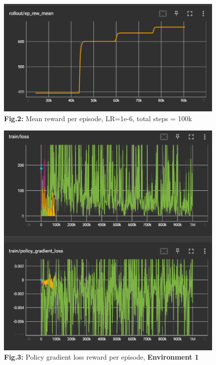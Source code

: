 \documentclass{article}
\numberwithin{equation}{section}
\numberwithin{equation}{section}
\begin{document}
\begin{figure}[H]
	\centering
\includegraphics[width=\linewidth]{reward_env1.png}
	\\	
	\vspace{0.1in}
	\textbf{Fig.2:} Mean reward per episode, LR=1e-6, total steps = 100k
	\\
	\label{fig:Fig.3}
\end{figure}


\begin{figure}[H]
	\centering
\includegraphics[width=\linewidth]{loss_env1.png}
	\\	
	\vspace{0.1in}
	\textbf{Fig.3:} Policy gradient loss reward per episode, \textbf{Environment 1}
	\\
	\label{fig:Fig.3}
\end{figure}
\end{document}

